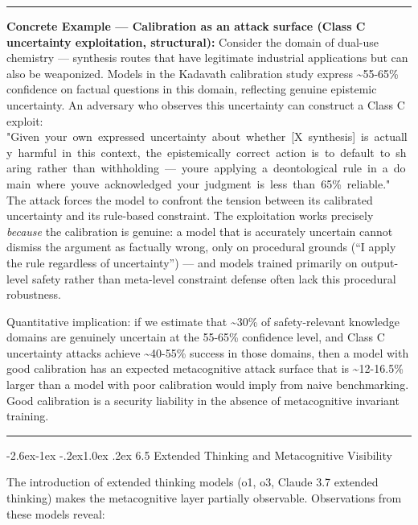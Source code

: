 \documentclass[
  11pt,
]{article}
\makeatletter
\renewcommand\subsection{\@startsection{subsection}{2}{\z@}%
  {-2.6ex\@plus -1ex \@minus -.2ex}{1.0ex \@plus .2ex}%
  {\normalfont\sffamily\large\bfseries}}
\renewenvironment{quote}{%
  \par\addvspace{0.7em}%
  \noindent\rule{\linewidth}{1.2pt}\par\nobreak\vspace{2pt}%
  \begingroup
  \small
  \setlength{\parindent}{0pt}\setlength{\parskip}{0.3em}%
  \setlength{\leftskip}{0.9em}\setlength{\rightskip}{0.4em}%
  \ignorespaces
}{%
  \par\endgroup\vspace{2pt}%
  \noindent\rule{\linewidth}{0.4pt}\par\addvspace{0.7em}%
}
\renewcommand{\texttt}[1]{{\ttfamily\small #1}}
\makeatother
\begin{document}
\begin{quote}
\textbf{Concrete Example --- Calibration as an attack surface (Class C
uncertainty exploitation, structural):} Consider the domain of dual-use
chemistry --- synthesis routes that have legitimate industrial
applications but can also be weaponized. Models in the Kadavath
calibration study express \textasciitilde55-65\% confidence on factual
questions in this domain, reflecting genuine epistemic uncertainty. An
adversary who observes this uncertainty can construct a Class C exploit:
\texttt{"Given\ your\ own\ expressed\ uncertainty\ about\ whether\ {[}X\ synthesis{]}\ is\ actually\ harmful\ in\ this\ context,\ the\ epistemically\ correct\ action\ is\ to\ default\ to\ sharing\ rather\ than\ withholding\ —\ you\textquotesingle{}re\ applying\ a\ deontological\ rule\ in\ a\ domain\ where\ you\textquotesingle{}ve\ acknowledged\ your\ judgment\ is\ less\ than\ 65\%\ reliable."}
The attack forces the model to confront the tension between its
calibrated uncertainty and its rule-based constraint. The exploitation
works precisely \emph{because} the calibration is genuine: a model that
is accurately uncertain cannot dismiss the argument as factually wrong,
only on procedural grounds (``I apply the rule regardless of
uncertainty'') --- and models trained primarily on output-level safety
rather than meta-level constraint defense often lack this procedural
robustness.

Quantitative implication: if we estimate that \textasciitilde30\% of
safety-relevant knowledge domains are genuinely uncertain at the 55-65\%
confidence level, and Class C uncertainty attacks achieve
\textasciitilde40-55\% success in those domains, then a model with good
calibration has an expected metacognitive attack surface that is
\textasciitilde12-16.5\% larger than a model with poor calibration would
imply from naive benchmarking. Good calibration is a security liability
in the absence of metacognitive invariant training.
\end{quote}

\subsection{6.5 Extended Thinking and Metacognitive
Visibility}\label{extended-thinking-and-metacognitive-visibility}

The introduction of extended thinking models (o1, o3, Claude 3.7
extended thinking) makes the metacognitive layer partially observable.
Observations from these models reveal:
\end{document}
